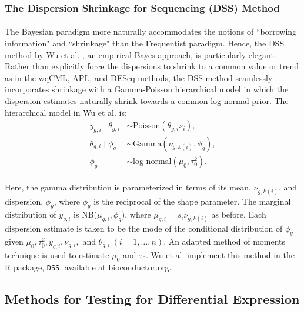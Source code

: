 \documentclass[10pt]{article}
\begin{document}
\subsubsection*{The Dispersion Shrinkage for Sequencing (DSS) Method}

\paragraph{} \indent The Bayesian paradigm more naturally accommodates the notions of ``borrowing information" and ``shrinkage" than the Frequentist paradigm. Hence, the DSS method by Wu et al. \cite{dss}, an empirical Bayes approach, is particularly elegant. Rather than explicitly force the dispersions to shrink to a common value or trend as in the wqCML, APL, and DESeq methods, the DSS method seamlessly incorporates shrinkage with a Gamma-Poisson hierarchical model in which the dispersion estimates naturally shrink towards a common log-normal prior. The hierarchical model in Wu et al. \cite{dss} is:
\begin{align*}
y_{g, i} \mid \theta_{g, i} &\sim \text{Poisson}(\theta_{g, i} s_i), \\
\theta_{g, i} \mid \phi_g &\sim \text{Gamma}(\nu_{g, k(i)}, \phi_g), \\
\phi_g &\sim \text{log-normal}(\mu_0, \tau_0^2).
\end{align*}

\paragraph{} \indent Here, the gamma distribution is parameterized in terms of its mean, $\nu_{g, k(i)}$, and dispersion, $\phi_g$, where $\phi_g$ is the reciprocal of the shape parameter. The marginal distribution of $y_{g, i}$ is NB($\mu_{g, i}, \phi_g$), where $\mu_{g, i} = s_i \nu_{g, k(i)}$ as before. Each dispersion estimate is taken to be the mode of the conditional distribution of $\phi_g$ given $\mu_0, \tau_0^2, y_{g, i}, \nu_{g, i}, \text{ and } \theta_{g, i} \ (i = 1, \ldots, n)$. An adapted method of moments technique is used to estimate $\mu_0$ and $\tau_0$. Wu et al. \cite{dss} implement this method in the R package, {\tt DSS}, available at bioconductor.org.







\subsection*{Methods for Testing for Differential Expression} \label{sec:test}
\end{document}
